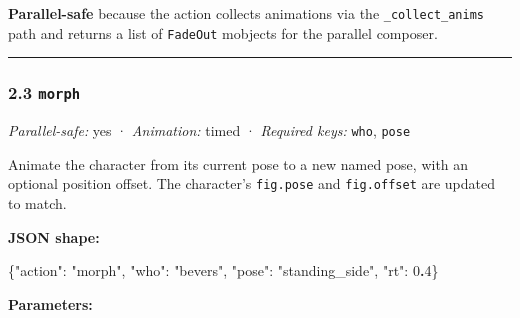 \documentclass[
  12pt,
  letterpaper,
]{book}
\newenvironment{Shaded}{}{}
\newcommand{\DataTypeTok}[1]{\textcolor[rgb]{0.56,0.13,0.00}{#1}}
\newcommand{\DecValTok}[1]{\textcolor[rgb]{0.25,0.63,0.44}{#1}}
\newcommand{\ErrorTok}[1]{\textcolor[rgb]{1.00,0.00,0.00}{\textbf{#1}}}
\newcommand{\FunctionTok}[1]{\textcolor[rgb]{0.02,0.16,0.49}{#1}}
\newcommand{\StringTok}[1]{\textcolor[rgb]{0.25,0.44,0.63}{#1}}
\begin{document}
\textbf{Parallel-safe} because the action collects animations via the
\texttt{\_collect\_anims} path and returns a list of \texttt{FadeOut}
mobjects for the parallel composer.

\begin{center}\rule{0.5\linewidth}{0.5pt}\end{center}

\subsubsection{\texorpdfstring{2.3
\texttt{morph}}{2.3 morph}}\label{morph}

\emph{Parallel-safe:} yes · \emph{Animation:} timed · \emph{Required
keys:} \texttt{who}, \texttt{pose}

Animate the character from its current pose to a new named pose, with an
optional position offset. The character's \texttt{fig.pose} and
\texttt{fig.offset} are updated to match.

\textbf{JSON shape:}

\begin{Shaded}
\begin{Highlighting}[]
\FunctionTok{\{}\DataTypeTok{"action"}\FunctionTok{:} \StringTok{"morph"}\FunctionTok{,} \DataTypeTok{"who"}\FunctionTok{:} \StringTok{"bevers"}\FunctionTok{,} \DataTypeTok{"pose"}\FunctionTok{:} \StringTok{"standing\_side"}\FunctionTok{,} \DataTypeTok{"rt"}\FunctionTok{:} \DecValTok{0}\ErrorTok{.}\DecValTok{4}\FunctionTok{\}}
\end{Highlighting}
\end{Shaded}

\textbf{Parameters:}
\end{document}
